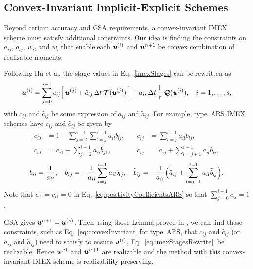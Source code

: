 \subsection{Convex-Invariant Implicit-Explicit Schemes}

Beyond certain accuracy and GSA requirements, a convex-invariant IMEX scheme must satisfy additional constraints.
Our idea is finding the constraints on $a_{ij}$, $\tilde{a}_{ij}$, $\tilde{w}_{i}$, and $w_{i}$ that enable each $\boldsymbol{u}^{(i)}$ and $\boldsymbol{u}^{n+1}$ be convex combination of realizable moments:

Following Hu et al\cite{hu_etal_2018}, the stage values in Eq.~\eqref{imexStages} can be rewritten as
\begin{equation}
  \boldsymbol{u}^{(i)}
  =\sum_{j=0}^{i-1}c_{ij}\Big[\,\boldsymbol{u}^{(j)}+\hat{c}_{ij}\,\Delta t\,\boldsymbol{\mathcal{T}}(\boldsymbol{u}^{(j)})\,\Big]
  +a_{ii}\,\Delta t\,\frac{1}{\tau}\,\boldsymbol{\mathcal{Q}}(\boldsymbol{u}^{(i)}),\quad i=1,\ldots,s,
  \label{eq:imexStagesRewrite}
\end{equation}
with $c_{ij}$ and $\hat{c}_{ij}$ be some expression of $a_{ij}$ and $\tilde{a}_{ij}$.
For example, type~ARS IMEX schemes have $c_{ij}$ and $\hat{c}_{ij}$ be given by
    \begin{equation}
     \begin{aligned}
      c_{i0} &= 1-\sum_{j=2}^{i-1}\sum_{l=j}^{i-1}a_{il}b_{lj}, \quad &
      c_{ij} &= \sum_{l=j}^{i-1}a_{il}b_{lj}, \\
      \tilde{c}_{i0} &= \tilde{a}_{i1}+\sum_{j=2}^{i-1}a_{ij}\tilde{b}_{j1}, \quad &
      \tilde{c}_{ij} &= \tilde{a}_{ij}+\sum_{l=j+1}^{i-1}a_{il}\tilde{b}_{lj},  
     \end{aligned}
     \label{eq:positivityCoefficientsARS}
    \end{equation}
    \begin{equation}
      b_{ii} = \frac{1}{a_{ii}}, \quad
      b_{ij} = -\frac{1}{a_{ii}}\sum_{l=j}^{i-1}a_{il}b_{lj}, \quad
      \tilde{b}_{ij} = -\frac{1}{a_{ii}}\Big(\tilde{a}_{ij}+\sum_{l=j+1}^{i-1}a_{il}\tilde{b}_{lj}\Big).  
    \end{equation}
Note that $c_{i1}=\tilde{c}_{i1}=0$ in Eq.~\eqref{eq:positivityCoefficientsARS} so that $\sum_{j=0}^{i-1}c_{ij}=1$.

GSA gives $\boldsymbol{u}^{n+1} = \boldsymbol{u}^{(s)}$.
Then using those Lemma proved in \cite{chu_etal_2018}, we can find those constraints, such as Eq.~\eqref{eq:convexInvariant} for type~ARS, that $c_{ij}$ and $\hat{c}_{ij}$ (or $a_{ij}$ and $\tilde{a}_{ij}$) need to satisfy to ensure $\boldsymbol{u}^{(i)}$, Eq.~\eqref{eq:imexStagesRewrite}, be realizable.
Hence $\boldsymbol{u}^{(i)}$ and $\boldsymbol{u}^{n+1}$ are realizable and the method with this convex-invariant IMEX scheme is realizability-preserving.

